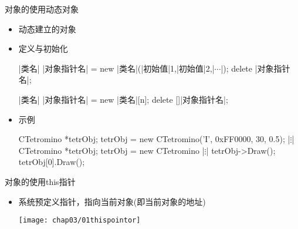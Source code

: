 \begin{frame}[t, fragile]{对象的使用}{动态对象}%
  \begin{itemize}
  \item 动态建立的对象
  \item 定义与初始化\\
    \begin{center}
      \begin{minipage}{0.8\linewidth}
        \begin{cpptt}
|类名| |对象指针名| = new |类名|(|初始值|1,|初始值|2,|$\cdots$|);
delete |对象指针名|;

|类名| |对象指针名| = new |类名|[n];
delete []|对象指针名|; 
        \end{cpptt}
      \end{minipage}
    \end{center}
  \item 示例
    \begin{center}
      \begin{minipage}{0.8\linewidth}
        \begin{cpptt}
CTetromino *tetrObj;
tetrObj = new CTetromino('I', 0xFF0000, 30, 0.5);
          |$\vdots$|
CTetromino *tetrObj;
tetrObj = new CTetromino
          |$\vdots$|
tetrObj->Draw();
tetrObj[0].Draw();
        \end{cpptt}
      \end{minipage}
    \end{center}
  \end{itemize}
\end{frame}

\begin{frame}[t, fragile]{对象的使用}{this指针}%
  \begin{itemize}
  \item 系统预定义指针，指向当前对象(即\alert{当前对象的地址})\\
    \begin{center}
      \begin{minipage}{0.4\linewidth}
      \end{minipage}\quad
      \begin{minipage}{0.47\linewidth}
        \centering
        \texttt{[image: chap03/01thispointor]}
      \end{minipage}
    \end{center}
  \end{itemize}
\end{frame}

